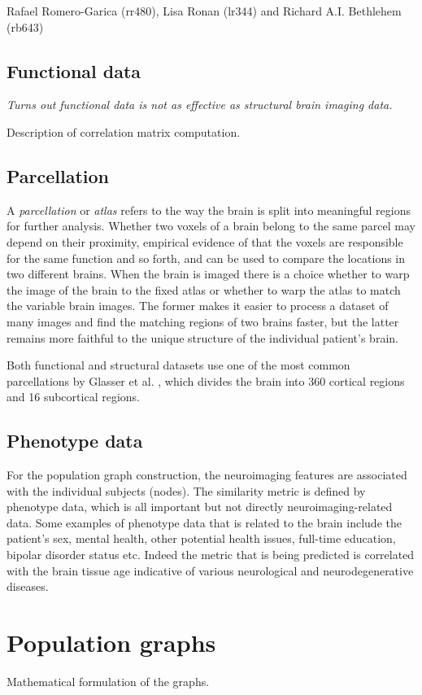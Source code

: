Rafael Romero-Garica (rr480), Lisa Ronan (lr344) and Richard A.I. Bethlehem (rb643)

\subsection{Functional data}
\textit{Turns out functional data is not as effective as structural brain imaging data.}

Description of correlation matrix computation.

\subsection{Parcellation}
A \textit{parcellation} or \textit{atlas} refers to the way the brain is split into meaningful regions for further analysis. Whether two voxels of a brain belong to the same parcel may depend on their proximity, empirical evidence of that the voxels are responsible for the same function and so forth, and can be used to compare the locations in two different brains. When the brain is imaged there is a choice whether to warp the image of the brain to the fixed atlas or whether to warp the atlas to match the variable brain images. The former makes it easier to process a dataset of many images and find the matching regions of two brains faster, but the latter remains more faithful to the unique structure of the individual patient's brain. 

Both functional and structural datasets use one of the most common parcellations by Glasser et al. \cite{glasser2016multi}, which divides the brain into 360 cortical regions and 16 subcortical regions. 

\subsection{Phenotype data}
For the population graph construction, the neuroimaging features are associated with the individual subjects (nodes). The similarity metric is defined by phenotype data, which is all important but not directly neuroimaging-related data. Some examples of phenotype data that is related to the brain include the patient's sex, mental health, other potential health issues, full-time education, bipolar disorder status etc. Indeed the metric that is being predicted is correlated with the brain tissue age indicative of various neurological and neurodegenerative diseases.

\section{Population graphs}
Mathematical formulation of the graphs.

